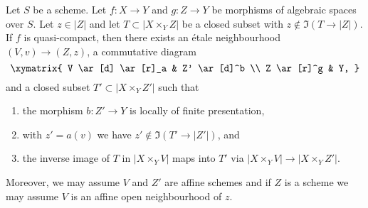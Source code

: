 \begin{lemma}
\label{lemma-separate}
Let $S$ be a scheme. Let $f : X \to Y$ and $g : Z \to Y$ be
morphisms of algebraic spaces over $S$. Let $z \in |Z|$ and let
$T \subset |X \times_Y Z|$ be a closed subset
with $z \not \in \Im(T \to |Z|)$.
If $f$ is quasi-compact, then there exists
an \'etale neighbourhood $(V, v) \to (Z, z)$,
a commutative diagram
$$
\xymatrix{
V \ar[d] \ar[r]_a & Z' \ar[d]^b \\
Z \ar[r]^g & Y,
}
$$
and a closed subset $T' \subset |X \times_Y Z'|$ such that
\begin{enumerate}
\item the morphism $b : Z' \to Y$ is locally of finite presentation,
\item with $z' = a(v)$ we have $z' \not \in \Im(T' \to |Z'|)$, and
\item the inverse image of $T$ in $|X \times_Y V|$
maps into $T'$ via $|X \times_Y V| \to |X \times_Y Z'|$.
\end{enumerate}
Moreover, we may assume $V$ and $Z'$ are affine schemes and if $Z$
is a scheme we may assume $V$ is an affine open neighbourhood of $z$.
\end{lemma}

